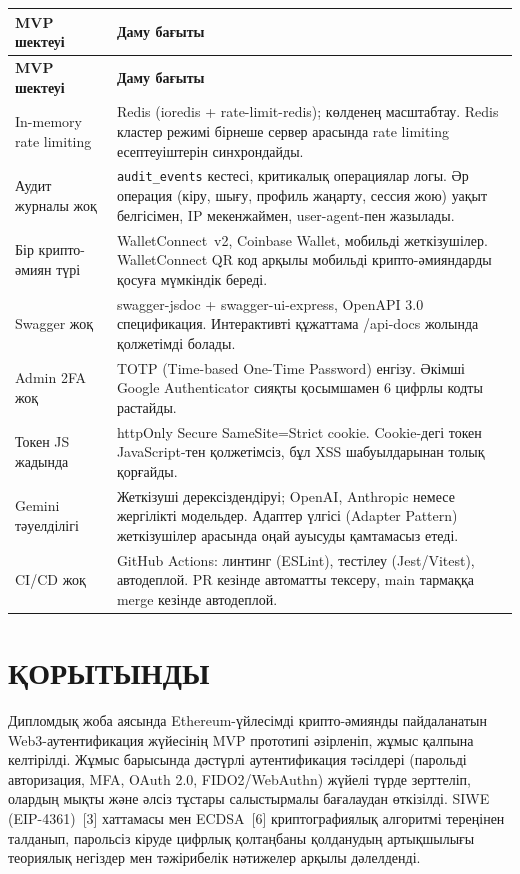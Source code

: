 \documentclass[14pt,a4paper]{extarticle}
\begin{document}
\begin{longtable}{|p{4.2cm}|p{10.0cm}|}
\hline\textbf{MVP шектеуі} & \textbf{Даму бағыты}\\\hline
\endfirsthead\hline\textbf{MVP шектеуі} & \textbf{Даму бағыты}\\\hline\endhead
In-memory rate limiting & Redis (ioredis + rate-limit-redis); көлденең масштабтау. Redis кластер режимі бірнеше сервер арасында rate limiting есептеуіштерін синхрондайды.\\\hline
Аудит журналы жоқ & \texttt{audit\_events} кестесі, критикалық операциялар логы. Әр операция (кіру, шығу, профиль жаңарту, сессия жою) уақыт белгісімен, IP мекенжаймен, user-agent-пен жазылады.\\\hline
Бір крипто-әмиян түрі & WalletConnect~v2, Coinbase Wallet, мобильді жеткізушілер. WalletConnect QR код арқылы мобильді крипто-әмияндарды қосуға мүмкіндік береді.\\\hline
Swagger жоқ & swagger-jsdoc + swagger-ui-express, OpenAPI 3.0 спецификация. Интерактивті құжаттама /api-docs жолында қолжетімді болады.\\\hline
Admin 2FA жоқ & TOTP (Time-based One-Time Password) енгізу. Әкімші Google Authenticator сияқты қосымшамен 6 цифрлы кодты растайды.\\\hline
Токен JS жадында & httpOnly Secure SameSite=Strict cookie. Cookie-дегі токен JavaScript-тен қолжетімсіз, бұл XSS шабуылдарынан толық қорғайды.\\\hline
Gemini тәуелділігі & Жеткізуші дерексіздендіруі; OpenAI, Anthropic немесе жергілікті модельдер. Адаптер үлгісі (Adapter Pattern) жеткізушілер арасында оңай ауысуды қамтамасыз етеді.\\\hline
CI/CD жоқ & GitHub Actions: линтинг (ESLint), тестілеу (Jest/Vitest), автодеплой. PR кезінде автоматты тексеру, main тармаққа merge кезінде автодеплой.\\\hline
\end{longtable}

\newpage
\section*{ҚОРЫТЫНДЫ}

Дипломдық жоба аясында Ethereum-үйлесімді крипто-әмиянды пайдаланатын Web3-аутентификация жүйесінің MVP прототипі әзірленіп, жұмыс қалпына келтірілді. Жұмыс барысында дәстүрлі аутентификация тәсілдері (парольді авторизация, MFA, OAuth 2.0, FIDO2/WebAuthn) жүйелі түрде зерттеліп, олардың мықты және әлсіз тұстары салыстырмалы бағалаудан өткізілді. SIWE (EIP-4361)~[3] хаттамасы мен ECDSA~[6] криптографиялық алгоритмі тереңінен талданып, парольсіз кіруде цифрлық қолтаңбаны қолданудың артықшылығы теориялық негіздер мен тәжірибелік нәтижелер арқылы дәлелденді.
\end{document}
